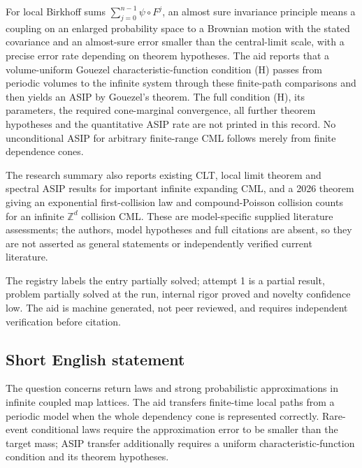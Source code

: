 \documentclass[11pt]{article}
\newcommand{\Z}{\mathbb{Z}}
\begin{document}
For local Birkhoff sums \(\sum_{j=0}^{n-1}\psi\circ F^j\), an almost sure invariance principle means a coupling on an enlarged probability space to a Brownian motion with the stated covariance and an almost-sure error smaller than the central-limit scale, with a precise error rate depending on theorem hypotheses. The aid reports that a volume-uniform Gouezel characteristic-function condition (H) passes from periodic volumes to the infinite system through these finite-path comparisons and then yields an ASIP by Gouezel's theorem. The full condition (H), its parameters, the required cone-marginal convergence, all further theorem hypotheses and the quantitative ASIP rate are not printed in this record. No unconditional ASIP for arbitrary finite-range CML follows merely from finite dependence cones.

The research summary also reports existing CLT, local limit theorem and spectral ASIP results for important infinite expanding CML, and a 2026 theorem giving an exponential first-collision law and compound-Poisson collision counts for an infinite \(\Z^d\) collision CML. These are model-specific supplied literature assessments; the authors, model hypotheses and full citations are absent, so they are not asserted as general statements or independently verified current literature.

The registry labels the entry partially solved; attempt 1 is a partial result, problem partially solved at the run, internal rigor proved and novelty confidence low. The aid is machine generated, not peer reviewed, and requires independent verification before citation.
\subsection{Short English statement}
The question concerns return laws and strong probabilistic approximations in infinite coupled map lattices. The aid transfers finite-time local paths from a periodic model when the whole dependency cone is represented correctly. Rare-event conditional laws require the approximation error to be smaller than the target mass; ASIP transfer additionally requires a uniform characteristic-function condition and its theorem hypotheses.
\end{document}
